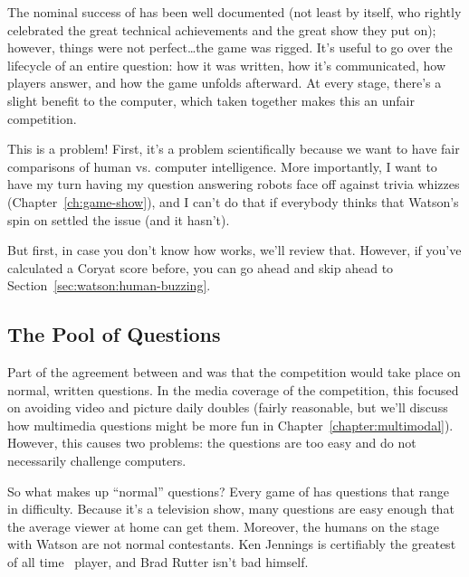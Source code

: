 The nominal success of \watson{} has been well documented (not least by 
itself, who rightly celebrated the great technical achievements and the great
show they put on); however,
things were not perfect\dots the game was rigged.
%
It's useful to go over the lifecycle of an entire question: how it was
written, how it's communicated, how players answer, and how the game
unfolds afterward.
%
At every stage, there's a slight benefit to the computer, which taken
together makes this an unfair competition.

This is a problem!  First, it's a problem scientifically because we
want to have fair comparisons of human vs. computer intelligence.
%
More importantly, I want to have my turn having my question answering
robots face off against trivia whizzes (Chapter~\ref{ch:game-show}),
and I can't do that if everybody thinks that Watson's spin
on \jeopardy{} settled the issue (and it hasn't).


But first, in case you don't know how \jeopardy{} works, we'll review
that.
%
However, if you've calculated a Coryat score before, you can go ahead
and skip ahead to Section~\ref{sec:watson:human-buzzing}.


\subsection{The Pool of Questions}


Part of the agreement between \jeopardy{} and  was that the
competition would take place on normal, written questions.
%
In the media coverage of the competition, this focused on avoiding
video and picture daily doubles (fairly reasonable, but we'll discuss
how multimedia questions might be more fun in Chapter~\ref{chapter:multimodal}).
%
However, this causes two problems: the questions are too easy and do
not necessarily challenge computers.

So what makes up ``normal'' questions?
%
Every game of \jeopardy{} has questions that range in difficulty.
%
Because it's a television show, many questions are easy enough that
the average viewer at home can get them.
%
Moreover, the humans on the stage with Watson are not normal contestants.
%
Ken Jennings is certifiably the greatest of all
time~\citep[]{low-20} \jeopardy{} player, and Brad Rutter
isn't bad himself.

